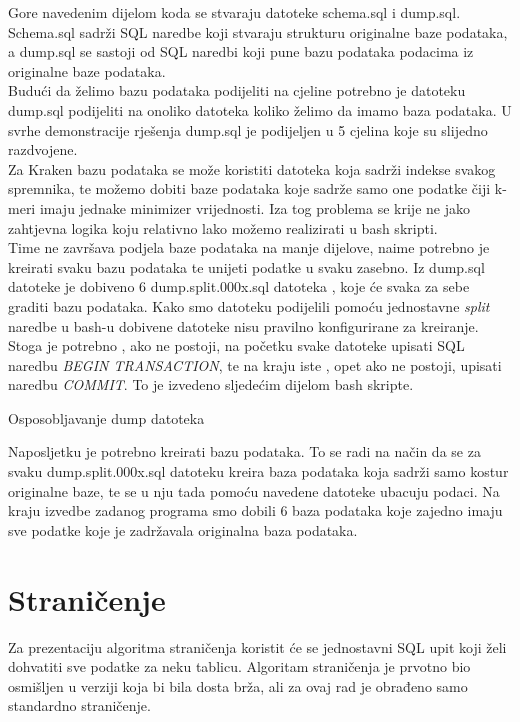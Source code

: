 \documentclass[times, utf8, zavrsni]{fer}
\begin{document}
Gore navedenim dijelom koda se stvaraju datoteke schema.sql i dump.sql. Schema.sql sadrži SQL naredbe koji stvaraju strukturu originalne baze podataka, a dump.sql se sastoji od SQL naredbi koji pune bazu podataka podacima iz originalne baze podataka.
\\Budući da želimo bazu podataka podijeliti na cjeline potrebno je datoteku dump.sql podijeliti na onoliko datoteka koliko želimo da imamo baza podataka. U svrhe demonstracije rješenja dump.sql je podijeljen u 5 cjelina koje su slijedno razdvojene. \\Za Kraken bazu podataka se može koristiti datoteka koja sadrži indekse svakog spremnika, te možemo dobiti baze podataka koje sadrže samo one podatke čiji k-meri imaju jednake minimizer vrijednosti. Iza tog problema se krije ne jako zahtjevna logika koju relativno lako možemo realizirati u bash skripti.
\\Time ne završava podjela baze podataka na manje dijelove, naime potrebno je kreirati svaku bazu podataka te unijeti podatke u svaku zasebno. Iz dump.sql datoteke je dobiveno 6 dump.split.000x.sql datoteka , koje će svaka za sebe graditi bazu podataka. Kako smo datoteku podijelili pomoću jednostavne \textit{split} naredbe u bash-u dobivene datoteke nisu pravilno konfigurirane za kreiranje. Stoga je potrebno , ako ne postoji, na početku svake datoteke upisati SQL naredbu  \textit{BEGIN TRANSACTION}, te na kraju iste , opet ako ne postoji, upisati naredbu \textit{COMMIT}. To je izvedeno sljedećim dijelom bash skripte.

\begin{algorithm}[H]
	\caption{Osposobljavanje dump datoteka}
	\label{DumpBp}
\end{algorithm}

Naposljetku je potrebno kreirati bazu podataka. To se radi na način da se za svaku dump.split.000x.sql datoteku kreira baza podataka koja sadrži samo kostur originalne baze, te se u nju tada pomoću navedene datoteke ubacuju podaci. Na kraju izvedbe zadanog programa smo dobili 6 baza podataka koje zajedno imaju sve podatke koje je zadržavala originalna baza podataka.

\section{Straničenje}
Za prezentaciju algoritma straničenja koristit će se jednostavni SQL upit koji želi dohvatiti sve podatke za neku tablicu. Algoritam straničenja je prvotno bio osmišljen u verziji koja bi bila dosta brža, ali za ovaj rad je obrađeno samo standardno straničenje.
\end{document}
